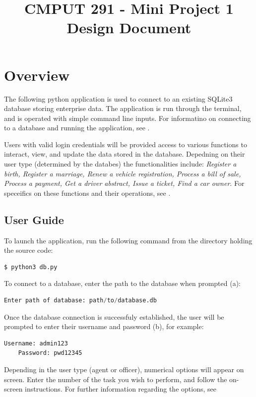 \documentclass[10pt, a4paper]{article}
\begin{document}
{\selectfont

\title{\vspace{-20mm}CMPUT 291 - Mini Project 1 Design Document}
\date{}
\maketitle
\vspace{-20mm}
\section{Overview}\label{OV}
The following python application is used to connect to an existing SQLite3 database storing enterprise data. The application is run through the terminal, and is operated with simple command line inputs. For informatino on connecting to a database and running the application, see \emph{}.

Users with valid login credentials will be provided access to various functions to interact, view, and update the data stored in the database. Depedning on their user type (determined by the databes) the functionalities include: \emph{Register a birth, Register a marriage, Renew a vehicle registration, Process a bill of sale, Process a payment, Get a driver abstract, Issue a ticket, Find a car owner}. For speceifics on these functions and their operations, see \emph{}.

\subsection{User Guide}\label{UG}
To launch the application, run the following command from the directory holding the source code:

\begin{lstlisting}[language=Python]
	$ python3 db.py
\end{lstlisting}
To connect to a database, enter the path to the database when prompted (a):
\begin{lstlisting}[language=Python]
	Enter path of database: path/to/database.db
\end{lstlisting}
Once the database connection is successfuly established, the user will be prompted to enter their username and password (b), for example:

\begin{lstlisting}[language=Python]		
	Username: admin123
	Password: pwd12345
\end{lstlisting}
Depending in the user type (agent or officer), numerical options will appear on screen. Enter the number of the task you wish to perform, and follow the on-screen instructions. For further information regarding the options, see \emph{}


}
\end{document}
